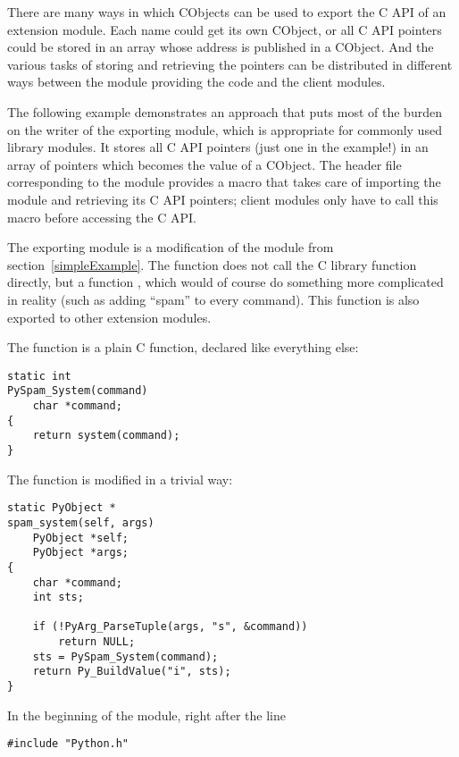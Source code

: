 \documentclass{manual}
\begin{document}
There are many ways in which CObjects can be used to export the C API
of an extension module. Each name could get its own CObject, or all C
API pointers could be stored in an array whose address is published in
a CObject. And the various tasks of storing and retrieving the pointers
can be distributed in different ways between the module providing the
code and the client modules.

The following example demonstrates an approach that puts most of the
burden on the writer of the exporting module, which is appropriate
for commonly used library modules. It stores all C API pointers
(just one in the example!) in an array of  pointers which
becomes the value of a CObject. The header file corresponding to
the module provides a macro that takes care of importing the module
and retrieving its C API pointers; client modules only have to call
this macro before accessing the C API.

The exporting module is a modification of the  module from
section~\ref{simpleExample}. The function 
does not call the C library function  directly,
but a function , which would of course do
something more complicated in reality (such as adding ``spam'' to
every command). This function  is also
exported to other extension modules.

The function  is a plain C function,
declared  like everything else:

\begin{verbatim}
static int
PySpam_System(command)
    char *command;
{
    return system(command);
}
\end{verbatim}

The function  is modified in a trivial way:

\begin{verbatim}
static PyObject *
spam_system(self, args)
    PyObject *self;
    PyObject *args;
{
    char *command;
    int sts;

    if (!PyArg_ParseTuple(args, "s", &command))
        return NULL;
    sts = PySpam_System(command);
    return Py_BuildValue("i", sts);
}
\end{verbatim}

In the beginning of the module, right after the line

\begin{verbatim}
#include "Python.h"
\end{verbatim}
\end{document}
